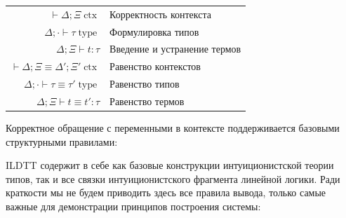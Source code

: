 \documentclass[12pt]{article}
\DeclareMathOperator{\ctx}{ctx}
\DeclareMathOperator{\type}{type}
\begin{document}
\begin{center}
\begin{tabular}{rl}
  $\vdash \Delta; \Xi \ctx$ & Корректность контекста \\
  $\Delta; \cdot \vdash \tau \type$ & Формулировка типов \\
  $\Delta; \Xi \vdash t: \tau$ & Введение и устранение термов \\
  $\vdash \Delta; \Xi \equiv \Delta'; \Xi' \ctx$
    & Равенство контекстов \\
  $\Delta; \cdot \vdash \tau \equiv \tau' \type$ & Равенство типов \\
  $\Delta; \Xi \vdash t \equiv t': \tau$ & Равенство термов
\end{tabular}
\end{center}

Корректное обращение с переменными в контексте поддерживается базовыми
структурными правилами:

ILDTT содержит в себе как базовые конструкции интуиционистской теории типов, так
и все связки интуиционистского фрагмента линейной логики. Ради краткости мы не
будем приводить здесь все правила вывода, только самые важные для демонстрации
принципов построения системы:
\end{document}
